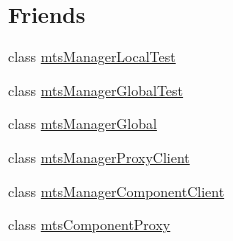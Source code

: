 \subsection*{Friends}
\begin{DoxyCompactItemize}
\item 
class \hyperlink{classmts_manager_local_adc2ae8db48d5418c526f275aafa3d4a9}{mts\-Manager\-Local\-Test}
\item 
class \hyperlink{classmts_manager_local_aad203c194c05c2d9063ff2face4590be}{mts\-Manager\-Global\-Test}
\item 
class \hyperlink{classmts_manager_local_a39a5abeb1bc2e952381b33eec702ba96}{mts\-Manager\-Global}
\item 
class \hyperlink{classmts_manager_local_a6bee6b58692a3a678a2f7543b8158fd3}{mts\-Manager\-Proxy\-Client}
\item 
class \hyperlink{classmts_manager_local_abdd48306351388730b5025e062ae1069}{mts\-Manager\-Component\-Client}
\item 
class \hyperlink{classmts_manager_local_a744ae66bbeeeba6ef38e59a2dd5e9743}{mts\-Component\-Proxy}
\end{DoxyCompactItemize}


